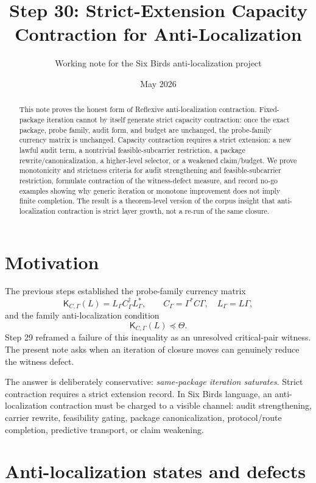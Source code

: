 \documentclass[11pt]{article}
\title{Step 30: Strict-Extension Capacity Contraction for Anti-Localization}
\author{Working note for the Six Birds anti-localization project}
\date{May 2026}
\newcommand{\K}{\mathsf K}
\begin{document}
\maketitle

\begin{abstract}
This note proves the honest form of Reflexive anti-localization contraction. Fixed-package iteration cannot by itself generate strict capacity contraction: once the exact package, probe family, audit form, and budget are unchanged, the probe-family currency matrix is unchanged. Capacity contraction requires a strict extension: a new lawful audit term, a nontrivial feasible-subcarrier restriction, a package rewrite/canonicalization, a higher-level selector, or a weakened claim/budget. We prove monotonicity and strictness criteria for audit strengthening and feasible-subcarrier restriction, formulate contraction of the witness-defect measure, and record no-go examples showing why generic iteration or monotone improvement does not imply finite completion. The result is a theorem-level version of the corpus insight that anti-localization contraction is strict layer growth, not a re-run of the same closure.
\end{abstract}

\section{Motivation}
The previous steps established the probe-family currency matrix
\[
  \K_{C,\Gamma}(L)=L_\Gamma C_\Gamma^\dagger L_\Gamma^*,
  \qquad C_\Gamma=\Gamma^*C\Gamma,\quad L_\Gamma=L\Gamma,
\]
and the family anti-localization condition
\[
  \K_{C,\Gamma}(L)\preceq \Theta .
\]
Step 29 reframed a failure of this inequality as an unresolved critical-pair witness. The present note asks when an iteration of closure moves can genuinely reduce the witness defect.

The answer is deliberately conservative: \emph{same-package iteration saturates}. Strict contraction requires a strict extension record. In Six Birds language, an anti-localization contraction must be charged to a visible channel: audit strengthening, carrier rewrite, feasibility gating, package canonicalization, protocol/route completion, predictive transport, or claim weakening.

\section{Anti-localization states and defects}
\end{document}
